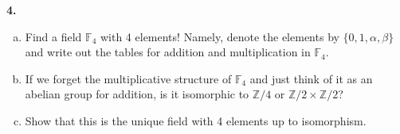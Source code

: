 \documentclass[12pt]{amsart}
\newenvironment{statement}[1]{\smallskip\noindent\color[rgb]{1.00,0.00,0.50} {\bf #1.}}{}
\theoremstyle{definition}
\theoremstyle{remark}
\newcommand{\F}{\mathbb F}
\newcommand{\Z}{\mathbb Z}
\begin{document}
\begin{statement}{4}

  \begin{enumerate}[(a)]
    \item Find a field $\F_4$ with 4 elements! Namely, denote the elements by $\{0, 1, \alpha, \beta\}$ and write out the tables for addition and multiplication in $\F_4$. 
    \item If we forget the multiplicative structure of $\F_4$ and just think of it as an abelian group
for addition, is it isomorphic to $\Z/4$ or $\Z/2 \times \Z/2$?
\item Show that this is the unique field with 4 elements up to isomorphism.
  \end{enumerate}

\end{statement}
\end{document}
